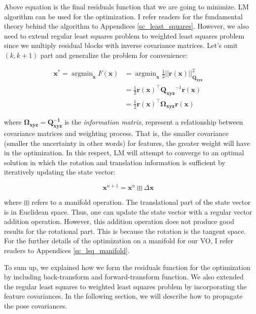 \documentclass[a4paper]{report}
\numberwithin{figure}{section}
\newcommand{\argmin}{\mathop{\mathrm{argmin}}}
\begin{document}
Above equation is the final residuals function that we are going to minimize.
LM algorithm can be used for the optimization. I refer readers for the
fundamental theory behind the algorithm to Appendices
\ref{sc_least_squares}.  However, we also need to extend regular least squares
problem to weighted least squares problem since we multiply residual blocks
with inverse covariance matrices.  Let's omit $(k,k+1)$ part and generalize the
problem for convenience:

\begin{equation} \begin{aligned} \mathbf{x}^* = \argmin_{\mathbf{x}}
F(\mathbf{x}) & = \argmin_{\mathbf{x}} \frac{1}{2}
||\mathbf{r}(\mathbf{x})||^2_{\mathbf{Q_{xyz}}} \\ & = \frac{1}{2}
\mathbf{r}(\mathbf{x})^\top \mathbf{Q_{xyz}}^{-1} \mathbf{r}(\mathbf{x}) 
\\ & =
\frac{1}{2} \mathbf{r}(\mathbf{x})^\top \mathbf{\Omega}_{\mathbf{xyz}}
\mathbf{r}(\mathbf{x}) \end{aligned}
\end{equation}\label{eq:residuals_objective}

where $\mathbf{\Omega_{xyz} = Q^{-1}_{xyz}}$ is the \textit{information
matrix}, represent a relationship between covariance matrices and weighting
process.  That is, the smaller covariance (smaller the uncertainty in other
words) for features, the greater weight will have in the optimization.  In this
respect, LM will attempt to converge to an optimal solution in which the
rotation and translation information is sufficient by iteratively updating the
state vector:

\begin{equation} \mathbf{x}^{n+1} = \mathbf{x}^{n} \boxplus \Delta \mathbf{x}
\end{equation}

where $\boxplus$ refers to a manifold operation.  The translational part of the
state vector is in Euclidean space. Thus, one can update the state vector with
a regular vector addition operation.  However, this addition operation does not
produce good results for the rotational part. This is because the rotation is
the tangent space.  For the further details of the optimization on a manifold
for our VO, I refer readers to Appendices \ref{sc_lsq_manifold}.

To sum up, we explained how we form the residuals function for the optimization
by including back-transform and forward-transform function. We also extended
the regular least squares to weighted least squares problem by incorporating
the feature covariances. In the following section, we will describe how to
propagate the pose covariances.
\end{document}

